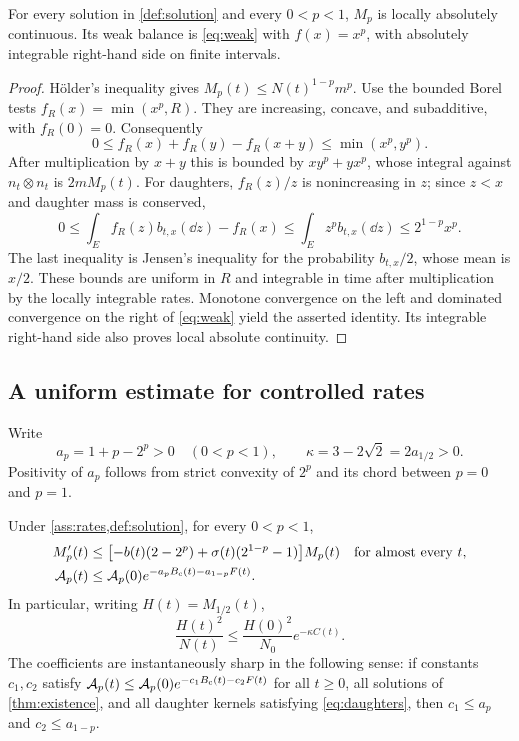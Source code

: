\begin{lemma}\label{lem:moment-balance}
For every solution in \cref{def:solution} and every $0<p<1$, $M_p$ is
locally absolutely continuous. Its weak balance is \eqref{eq:weak} with
$f(x)=x^p$, with absolutely integrable right-hand side on finite intervals.
\end{lemma}

\begin{proof}
H\"older's inequality gives $M_p(t)\leq N(t)^{1-p}m^p$.
Use the bounded Borel tests $f_R(x)=\min(x^p,R)$.
They are increasing, concave, and subadditive, with $f_R(0)=0$.
Consequently
\[
 0\leq f_R(x)+f_R(y)-f_R(x+y)\leq\min(x^p,y^p).
\]
After multiplication by $x+y$ this is bounded by $xy^p+yx^p$,
whose integral against $n_t\otimes n_t$ is $2mM_p(t)$.
For daughters, $f_R(z)/z$ is nonincreasing in $z$; since $z<x$ and
daughter mass is conserved,
\[
 0\leq\int_E f_R(z)b_{t,x}(\dd z)-f_R(x)
 \leq\int_E z^p b_{t,x}(\dd z)\leq2^{1-p}x^p.
\]
The last inequality is Jensen's inequality for the probability
$b_{t,x}/2$, whose mean is $x/2$. These bounds are uniform in $R$ and
integrable in time after multiplication by the locally integrable rates.
Monotone convergence on the left and dominated convergence on the right
of \eqref{eq:weak} yield the asserted identity. Its integrable right-hand
side also proves local absolute continuity.
\end{proof}

\subsection{A uniform estimate for controlled rates}

Write
\begin{equation}
 a_p=1+p-2^p>0\quad(0<p<1),\qquad
 \kappa=3-2\sqrt2=2a_{1/2}>0.
 \label{eq:constants}
\end{equation}
Positivity of $a_p$ follows from strict convexity of $2^p$ and its chord
between $p=0$ and $p=1$.

\begin{theorem}\label{thm:affinity}
Under \cref{ass:rates,def:solution}, for every $0<p<1$,
\begin{align}
 M_p'(t)&\leq
 \bigl[-b(t)(2-2^p)+\sigma(t)(2^{1-p}-1)\bigr]M_p(t)
 \quad\text{for almost every }t,\label{eq:raw-moment}\\
 \mathcal A_p(t)&\leq\mathcal A_p(0)
        e^{-a_pB_{\mathrm c}(t)-a_{1-p}F(t)}.\label{eq:affinity-decay}
\end{align}
In particular, writing $H(t)=M_{1/2}(t)$,
\begin{equation}
 \frac{H(t)^2}{N(t)}\leq\frac{H(0)^2}{N_0}e^{-\kappa C(t)}.
 \label{eq:half-decay}
\end{equation}
The coefficients are instantaneously sharp in the following sense: if
constants $c_1,c_2$ satisfy
$\mathcal A_p(t)\leq\mathcal A_p(0)e^{-c_1B_{\mathrm c}(t)-c_2F(t)}$ for all
$t\geq0$, all solutions of \cref{thm:existence}, and all daughter kernels
satisfying \eqref{eq:daughters}, then $c_1\leq a_p$ and $c_2\leq a_{1-p}$.
\end{theorem}

